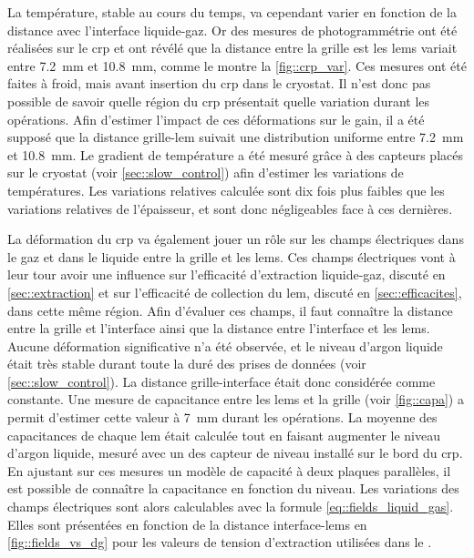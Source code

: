       La température, stable au cours du temps, va cependant varier en fonction de la distance avec l'interface liquide-gaz. Or des mesures de photogrammétrie ont été réalisées sur le \gls{crp} et ont révélé que la distance entre la grille est les \glspl{lem} variait entre \SI{7.2}{\milli\meter} et \SI{10.8}{\milli\meter}, comme le montre la \autoref{fig::crp_var}. Ces mesures ont été faites à froid, mais avant insertion du \gls{crp} dans le cryostat. Il n'est donc pas possible de savoir quelle région du \gls{crp} présentait quelle variation durant les opérations. Afin d'estimer l'impact de ces déformations sur le gain, il a été supposé que la distance grille-\gls{lem} suivait une distribution uniforme entre \SI{7.2}{\milli\meter} et \SI{10.8}{\milli\meter}. Le gradient de température a été mesuré grâce à des capteurs placés sur le cryostat (voir \autoref{sec::slow_control}) afin d'estimer les variations de températures. Les variations relatives calculée sont dix fois plus faibles que les variations relatives de l'épaisseur, et sont donc négligeables face à ces dernières.

      La déformation du \gls{crp} va également jouer un rôle sur les champs électriques dans le gaz et dans le liquide entre la grille et les \glspl{lem}. Ces champs électriques vont à leur tour avoir une influence sur l'efficacité d'extraction liquide-gaz, discuté en \autoref{sec::extraction} et sur l'efficacité de collection du \gls{lem}, discuté en \autoref{sec::efficacites}, dans cette même région. Afin d'évaluer ces champs, il faut connaître la distance entre la grille et l'interface ainsi que la distance entre l'interface et les \glspl{lem}. Aucune déformation significative n'a été observée, et le niveau d'argon liquide était très stable durant toute la duré des prises de données (voir \autoref{sec::slow_control}). La distance grille-interface était donc considérée comme constante. Une mesure de capacitance entre les \glspl{lem} et la grille (voir \autoref{fig::capa}) a permit d'estimer cette valeur à \SI{7}{\milli\meter} durant les opérations. La moyenne des capacitances de chaque \gls{lem} était calculée tout en faisant augmenter le niveau d'argon liquide, mesuré avec un des capteur de niveau installé sur le bord du \gls{crp}. En ajustant sur ces mesures un modèle de capacité à deux plaques parallèles, il est possible de connaître la capacitance en fonction du niveau. Les variations des champs électriques sont alors calculables avec la formule \eqref{eq::fields_liquid_gas}. Elles sont présentées en fonction de la distance interface-\glspl{lem} en \autoref{fig::fields_vs_dg} pour les valeurs de tension d'extraction utilisées dans le \TOO{}.

